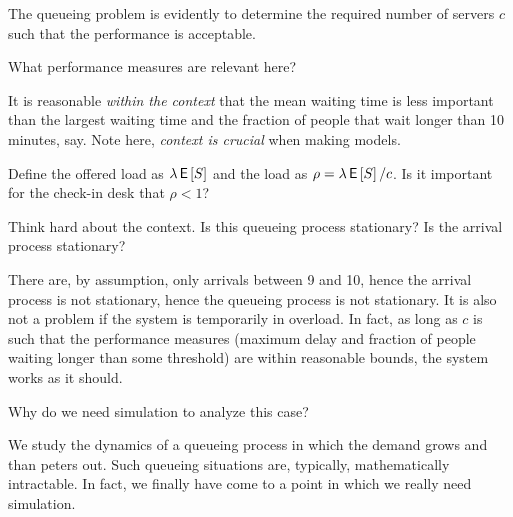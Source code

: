 The queueing problem  is evidently to determine the required number of servers $c$ such that the performance is acceptable. 

\begin{exercise}
  What performance measures are relevant here?
  \begin{solution}
    It is reasonable \emph{within the context} that the mean waiting time is less important than the largest waiting time and the fraction of people that wait longer than 10 minutes, say.
    Note here, \emph{context is crucial} when making models.
  \end{solution}
\end{exercise}

\begin{exercise}
  Define the offered load as $\lambda \,\mathsf{E}\left[S\right]$ and the load as $\rho = \lambda \,\mathsf{E}\left[S\right]/ c$. Is it important for the check-in desk that $\rho<1$? 

  \begin{hint}
    Think hard about the context. Is this queueing process stationary? Is the arrival process stationary? 
  \end{hint}
  \begin{solution}
    There are, by assumption, only arrivals between 9 and 10, hence the arrival process is not stationary, hence the queueing process is not stationary.  It is also not a problem if the system is temporarily in overload. In fact, as long as $c$ is such that the performance measures (maximum delay and fraction of people waiting longer than some threshold) are within reasonable bounds, the system works as it should.
  \end{solution}
\end{exercise}

\begin{exercise}
  Why do we need simulation to analyze this case?
  \begin{solution}
    We study the dynamics of a queueing process in which the demand grows and than peters out. Such queueing situations are, typically, mathematically intractable. In fact, we finally have come to a point in which we really need simulation. 
  \end{solution}
\end{exercise}


